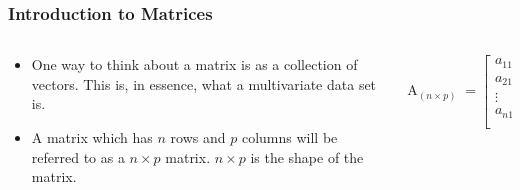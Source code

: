 \documentclass{beamer}
\begin{document}
\begin{frame}
  \frametitle{Introduction to Matrices}

\begin{columns}
\begin{column}{5.5cm}

\begin{itemize}
	\item One way to think about a matrix is as a collection of vectors. This is, in essence, what a multivariate data set is.

  \item A matrix which has $n$ rows and $p$ columns will be referred to as a  $n \times p$ matrix.  $n \times p$ is the shape of the matrix.
\end{itemize}

\end{column}

\begin{column}{5cm}

\[
\mathop{A}_{(n \times p)} = \left[ \begin{array}{cccc}

a_{11} & a_{12} & \cdots & a_{1p} \\
a_{21} & a_{22} & \cdots & a_{2p} \\
\vdots & \vdots & \vdots & \vdots \\
a_{n1} & a_{n2} & \cdots & a_{np} \\

\end{array}
\right]
\]

\end{column}

\end{columns}

\end{frame}

\end{document}
